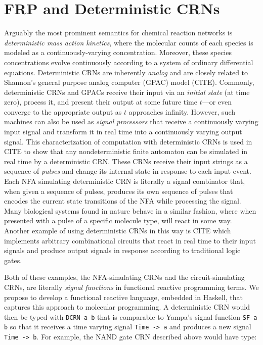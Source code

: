 
\section{FRP and Deterministic CRNs}
\label{sec:frp_dcrns}

Arguably the most prominent semantics for chemical reaction networks is \emph{deterministic mass action kinetics}, where the molecular counts of each species is modeled as a continuously-varying concentration.
Moreover, these species concentrations evolve continuously according to a system of ordinary differential equations.
Deterministic CRNs are inherently \emph{analog} and are closely related to Shannon's general purpose analog computer (GPAC) model (CITE).
Commonly, deterministic CRNs and GPACs receive their input via an \emph{initial state} (at time zero), process it, and present their output at some future time \( t \)---or even converge to the appropriate output as \( t \) approaches infinity.
However, such machines can also be used as \emph{signal processors} that receive a continuously varying input signal and transform it in real time into a continuously varying output signal.
This characterization of computation with deterministic CRNs is used in CITE  to show that any nondeterministic finite automaton can be simulated in real time by a deterministic CRN.
These CRNs receive their input strings as a sequence of \emph{pulses} and change its internal state in response to each input event.
Each NFA simulating deterministic CRN is literally a signal combinator that, when given a sequence of pulses, produces its own sequence of pulses that encodes the current state transitions of the NFA while processing the signal.
Many biological systems found in nature behave in a similar fashion, where when presented with a pulse of a specific molecule type, will react in some way.
Another example of using deterministic CRNs in this way is CITE  which implements arbitrary combinational circuits that react in real time to their input signals and produce output signals in response according to traditional logic gates.

Both of these examples, the NFA-simulating CRNs and the circuit-simulating CRNs, are literally \emph{signal functions} in functional reactive programming terms.
We propose to develop a functional reactive language, embedded in Haskell, that captures this approach to molecular programming.
A deterministic CRN would then be typed with \lstinline!DCRN a b! that is comparable to Yampa's signal function \lstinline!SF a b! so that it receives a time varying signal \lstinline!Time -> a! and produces a new signal \lstinline!Time -> b!.
For example, the NAND gate CRN described above would have type:

